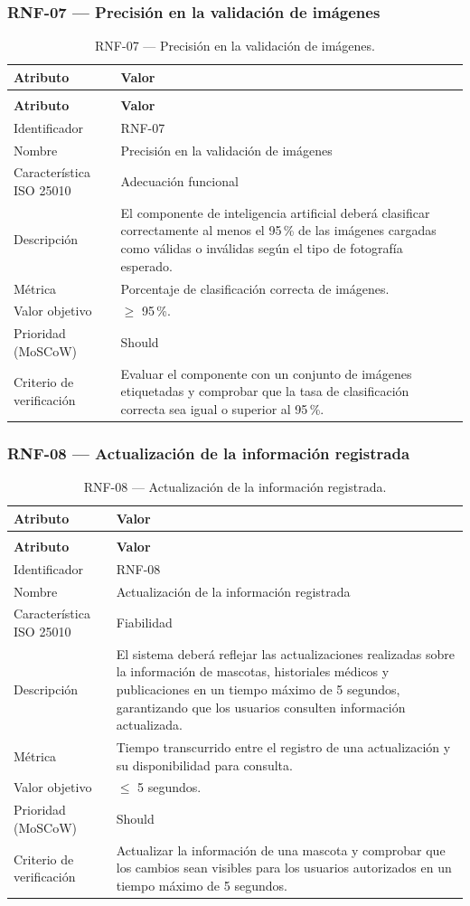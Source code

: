 \documentclass[journal,onecolumn]{IEEEtran}
\makeatletter
\newenvironment{atributos}[2]{%
	\small
	\begin{longtable}{@{}>{\raggedright\arraybackslash}p{4.2cm} >{\raggedright\arraybackslash}p{11.2cm}@{}}
		\caption{#2}\label{tab:#1}\\
		\toprule
		\textbf{Atributo} & \textbf{Valor} \\
		\midrule
		\endfirsthead
		\multicolumn{2}{@{}l}{\small\itshape (continuación)}\\
		\toprule
		\textbf{Atributo} & \textbf{Valor} \\
		\midrule
		\endhead
		\bottomrule
		\endlastfoot
	}{%
	\end{longtable}
	\normalsize
}
\makeatother
\begin{document}
	\subsubsection{RNF-07 --- Precisión en la validación de imágenes}
	
	\begin{atributos}{RNF-07}{RNF-07 --- Precisión en la validación de imágenes.}
		Identificador & RNF-07 \\
		Nombre & Precisión en la validación de imágenes \\
		Característica ISO 25010 & Adecuación funcional \\
		Descripción & El componente de inteligencia artificial deberá clasificar correctamente al menos el 95\,\% de las imágenes cargadas como válidas o inválidas según el tipo de fotografía esperado. \\
		Métrica & Porcentaje de clasificación correcta de imágenes. \\
		Valor objetivo & $\geq$ 95\,\%. \\
		Prioridad (MoSCoW) & Should \\
		Criterio de verificación & Evaluar el componente con un conjunto de imágenes etiquetadas y comprobar que la tasa de clasificación correcta sea igual o superior al 95\,\%. \\
	\end{atributos}
	
	\subsubsection{RNF-08 --- Actualización de la información registrada}
	
	\begin{atributos}{RNF-08}{RNF-08 --- Actualización de la información registrada.}
		Identificador & RNF-08 \\
		Nombre & Actualización de la información registrada \\
		Característica ISO 25010 & Fiabilidad \\
		Descripción & El sistema deberá reflejar las actualizaciones realizadas sobre la información de mascotas, historiales médicos y publicaciones en un tiempo máximo de 5 segundos, garantizando que los usuarios consulten información actualizada. \\
		Métrica & Tiempo transcurrido entre el registro de una actualización y su disponibilidad para consulta. \\
		Valor objetivo & $\leq$ 5 segundos. \\
		Prioridad (MoSCoW) & Should \\
		Criterio de verificación & Actualizar la información de una mascota y comprobar que los cambios sean visibles para los usuarios autorizados en un tiempo máximo de 5 segundos. \\
	\end{atributos}
	
\end{document}
